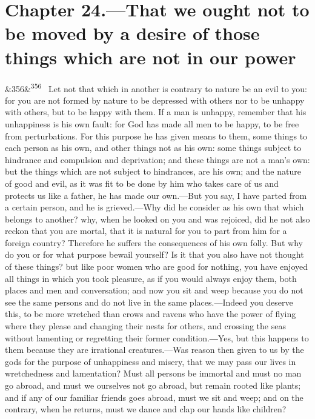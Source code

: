 \documentclass[12pt]{article}
\newcommand{\para}[1][]{\par\noindent\ifx&#1&\else\textsuperscript{\footnotesize #1}~\fi}
\begin{document}
\section*{Chapter 24.---That we ought not to be moved by a desire of those things which are not in our power}

\para[356] Let not that which in another is contrary to nature be an evil to you: for you are not formed by nature to be depressed with others nor to be unhappy with others, but to be happy with them. If a man is unhappy, remember that his unhappiness is his own fault: for God has made all men to be happy, to be free from perturbations. For this purpose he has given means to them, some things to each person as his own, and other things not as his own: some things subject to hindrance and compulsion and deprivation; and these things are not a man's own: but the things which are not subject to hindrances, are his own; and the nature of good and evil, as it was fit to be done by him who takes care of us and protects us like a father, he has made our own.—But you say, I have parted from a certain person, and he is grieved.—Why did he consider as his own that which belongs to another? why, when he looked on you and was rejoiced, did he not also reckon that you are mortal, that it is natural for you to part from him for a foreign country? Therefore he suffers the consequences of his own folly. But why do you or for what purpose bewail yourself? Is it that you also have not thought of these things? but like poor women who are good for nothing, you have enjoyed all things in which you took pleasure, as if you would always enjoy them, both places and men and conversation; and now you sit and weep because you do not see the same persons and do not live in the same places.—Indeed you deserve this, to be more wretched than crows and ravens who have the power of flying where they please and changing their nests for others, and crossing the seas without lamenting or regretting their former condition.―Yes, but this happens to them because they are irrational creatures.—Was reason then given to us by the gods for the purpose of unhappiness and misery, that we may pass our lives in wretchedness and lamentation? Must all persons be immortal and must no man go abroad, and must we ourselves not go abroad, but remain rooted like plants; and if any of our familiar friends goes abroad, must we sit and weep; and on the contrary, when he returns, must we dance and clap our hands like children?
\end{document}
